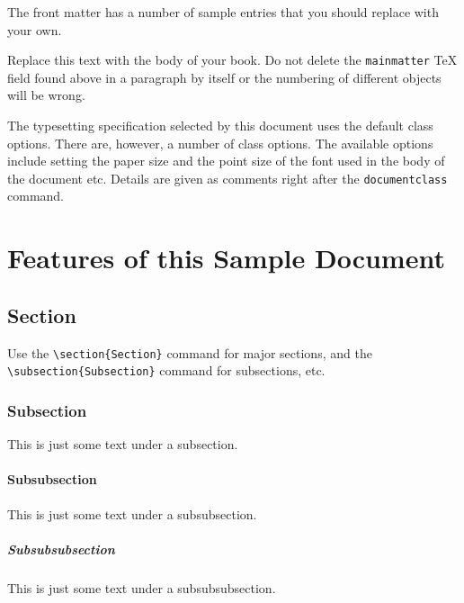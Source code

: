 \documentclass{amsbook}%
\theoremstyle{plain}
\numberwithin{equation}{section}
\begin{document}
The front matter has a number of sample entries that you should
replace with your own.

Replace this text with the body of your book. Do not delete the
\verb|mainmatter| TeX field found above in a paragraph by itself
or the numbering of different objects will be wrong.

The typesetting specification selected by this document uses the
default class options. There are, however, a number of class
options. The available options include setting the paper size and
the point size of the font used in the body of the document etc.
Details are given as comments right after the \verb|documentclass|
command.

\chapter{Features of this Sample Document}

\section{Section}

Use the \verb"\section{Section}" command for major sections, and
the \verb"\subsection{Subsection}" command for subsections, etc.

\subsection{Subsection}

This is just some text under a subsection.

\subsubsection{Subsubsection}

This is just some text under a subsubsection.

\paragraph{Subsubsubsection}

This is just some  text under a subsubsubsection.
\end{document}
